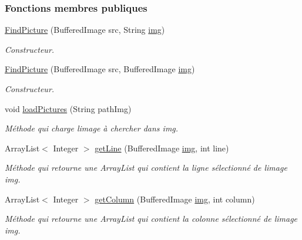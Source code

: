\subsubsection*{Fonctions membres publiques}
\begin{DoxyCompactItemize}
\item 
\hyperlink{classTestSushi_1_1src_1_1Pictures_1_1FindPicture_abb6768894f5395ad3b39c53f11cb330f}{Find\+Picture} (Buffered\+Image src, String \hyperlink{classTestSushi_1_1src_1_1Pictures_1_1FindPicture_a2efdf9b4cf94ca02ddc955f9a205c090}{img})
\begin{DoxyCompactList}\small\item\em Constructeur. \end{DoxyCompactList}\item 
\hyperlink{classTestSushi_1_1src_1_1Pictures_1_1FindPicture_ab96ff4f810f4f3d3db16671b22e76e37}{Find\+Picture} (Buffered\+Image src, Buffered\+Image \hyperlink{classTestSushi_1_1src_1_1Pictures_1_1FindPicture_a2efdf9b4cf94ca02ddc955f9a205c090}{img})
\begin{DoxyCompactList}\small\item\em Constructeur. \end{DoxyCompactList}\item 
void \hyperlink{classTestSushi_1_1src_1_1Pictures_1_1FindPicture_a0a7343c194f8daa44221581414372266}{load\+Pictures} (String path\+Img)
\begin{DoxyCompactList}\small\item\em Méthode qui charge l\textquotesingle{}image à chercher dans img. \end{DoxyCompactList}\item 
Array\+List$<$ Integer $>$ \hyperlink{classTestSushi_1_1src_1_1Pictures_1_1FindPicture_a11da4bbb2dfb596d71001f68b95f9cbb}{get\+Line} (Buffered\+Image \hyperlink{classTestSushi_1_1src_1_1Pictures_1_1FindPicture_a2efdf9b4cf94ca02ddc955f9a205c090}{img}, int line)
\begin{DoxyCompactList}\small\item\em Méthode qui retourne une Array\+List qui contient la ligne sélectionné de l\textquotesingle{}image img. \end{DoxyCompactList}\item 
Array\+List$<$ Integer $>$ \hyperlink{classTestSushi_1_1src_1_1Pictures_1_1FindPicture_ab56e357271314618a65a0634005e3aea}{get\+Column} (Buffered\+Image \hyperlink{classTestSushi_1_1src_1_1Pictures_1_1FindPicture_a2efdf9b4cf94ca02ddc955f9a205c090}{img}, int column)
\begin{DoxyCompactList}\small\item\em Méthode qui retourne une Array\+List qui contient la colonne sélectionné de l\textquotesingle{}image img. \end{DoxyCompactList}\item 

\end{DoxyCompactItemize}
